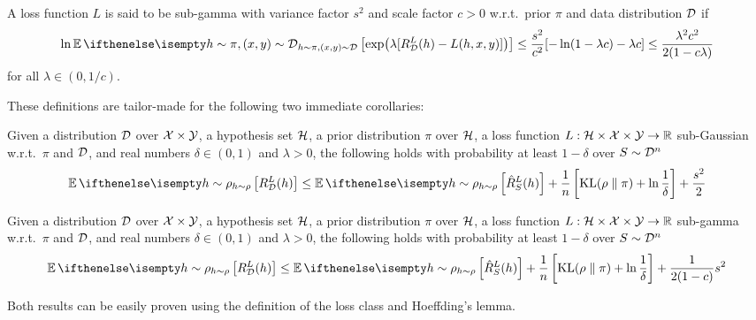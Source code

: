\begin{definition}
  A loss function $L$ is said to be sub-gamma with variance factor $s^2$ and
  scale factor $c > 0$ w.r.t.\ prior $\pi$ and data distribution $\mathcal{D}$ if
  \begin{equation}
    \ln \Ev[h \sim \pi, (x, y) \sim \CD]{\exp(\lambda [R_\CD^L(h) - L(h, x,
    y)])} \leq \frac{s^2}{c^2} [-\ln(1 - \lambda c) - \lambda c] \leq
    \frac{\lambda^2 c^2}{2 (1 - c \lambda)}
  \end{equation}
  for all $\lambda \in (0, 1 / c)$.
\end{definition}

These definitions are tailor-made for the following two immediate corollaries:

\begin{corollary}
  Given a distribution $\mathcal{D}$ over $\mathcal{X} \times \mathcal{Y}$, a hypothesis set $\mathcal{H}$, a
  prior distribution $\pi$ over $\mathcal{H}$, a loss function $L : \mathcal{H} \times \mathcal{X} \times
  \mathcal{Y} \to \mathbb{R}$ sub-Gaussian w.r.t.\ $\pi$ and $\mathcal{D}$, and real numbers $\delta \in
  (0, 1)$ and $\lambda > 0$, the following holds with probability at least $1 -
  \delta$ over $S \sim \mathcal{D}^n$
  \begin{equation}
    \label{eq:alquier-bound-sub-gaussian-loss}
    \Ev[h \sim \rho]{R_\CD^L(h)} \leq \Ev[h \sim \rho]{\hat{R}_S^L(h)} +
    \frac{1}{n}\left[\KL{\rho}{\pi} + \ln \frac{1}{\delta}\right] +
    \frac{s^2}{2}
  \end{equation}
\end{corollary}

\begin{corollary}
  Given a distribution $\mathcal{D}$ over $\mathcal{X} \times \mathcal{Y}$, a hypothesis set $\mathcal{H}$, a
  prior distribution $\pi$ over $\mathcal{H}$, a loss function $L : \mathcal{H} \times \mathcal{X} \times
  \mathcal{Y} \to \mathbb{R}$ sub-gamma w.r.t.\ $\pi$ and $\mathcal{D}$, and real numbers $\delta \in
  (0, 1)$ and $\lambda > 0$, the following holds with probability at least $1 -
  \delta$ over $S \sim \mathcal{D}^n$
  \begin{equation}
    \label{eq:alquier-bound-sub-gamma-loss}
    \Ev[h \sim \rho]{R_\CD^L(h)} \leq \Ev[h \sim \rho]{\hat{R}_S^L(h)} +
    \frac{1}{n}\left[\KL{\rho}{\pi} + \ln \frac{1}{\delta}\right] +
    \frac{1}{2 (1 - c)} s^2
  \end{equation}
\end{corollary}

Both results can be easily proven using the definition of the loss class and
Hoeffding's lemma.
